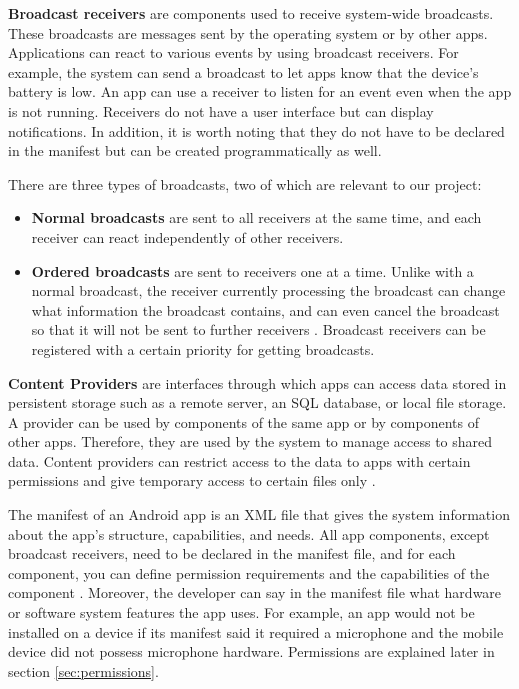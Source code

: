     \textbf{Broadcast receivers} are components used to receive system-wide broadcasts. These broadcasts are messages sent by the operating system or by other apps. Applications can react to various events by using broadcast receivers. For example, the system can send a broadcast to let apps know that the device’s battery is low. An app can use a receiver to listen for an event even when the app is not running. Receivers do not have a user interface but can display notifications. In addition, it is worth noting that they do not have to be declared in the manifest but can be created programmatically as well. 
    
    There are three types of broadcasts, two of which are relevant to our project:
    \begin{itemize}[noitemsep]
        \item \textbf{Normal broadcasts} are sent to all receivers at the same time, and each receiver can react independently of other receivers.
        \item \textbf{Ordered broadcasts} are sent to receivers one at a time. Unlike with a normal broadcast, the receiver currently processing the broadcast can change what information the broadcast contains, and can even cancel the broadcast so that it will not be sent to further receivers \cite{broadcasts_overview}. Broadcast receivers can be registered with a certain priority for getting broadcasts.
    \end{itemize}
        
    \textbf{Content Providers} are interfaces through which apps can access data stored in persistent storage such as a remote server, an SQL database, or local file storage. A provider can be used by components of the same app or by components of other apps. Therefore, they are used by the system to manage access to shared data. Content providers can restrict access to the data to apps with certain permissions and give temporary access to certain files only \cite{android_app_fundamentals}.
    
    The manifest of an Android app is an XML file that gives the system information about the app’s structure, capabilities, and needs. All app components, except broadcast receivers, need to be declared in the manifest file, and for each component, you can define permission requirements and the capabilities of the component \cite{android_app_fundamentals}. Moreover, the developer can say in the manifest file what hardware or software system features the app uses. For example, an app would not be installed on a device if its manifest said it required a microphone and the mobile device did not possess microphone hardware. Permissions are explained later in section \ref{sec:permissions}.
    
